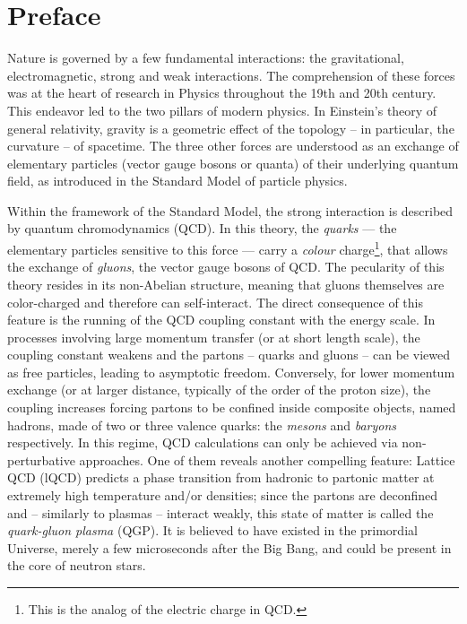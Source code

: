 \chapter{Preface}
\label{chap:Chapter1}

Nature is governed by a few fundamental interactions: the gravitational, electromagnetic, strong and weak interactions. The comprehension of these forces was at the heart of research in Physics throughout the 19th and 20th century. This endeavor led to the two pillars of modern physics. In Einstein's theory of general relativity, gravity is a geometric effect of the topology -- in particular, the curvature -- of spacetime. The three other forces are understood as an exchange of elementary particles (vector gauge bosons or quanta) of their underlying quantum field, as introduced in the Standard Model of particle physics.

Within the framework of the Standard Model, the strong interaction is described by quantum chromodynamics (QCD). In this theory, the \textit{quarks} --- the elementary particles sensitive to this force --- carry a \textit{colour} charge\footnote{This is the analog of the electric charge in QCD.}, that allows the exchange of \textit{gluons}, the vector gauge bosons of QCD. The pecularity of this theory resides in its non-Abelian structure, meaning that gluons themselves are color-charged and therefore can self-interact. The direct consequence of this feature is the running of the QCD coupling constant with the energy scale. In processes involving large momentum transfer (or at short length scale), the coupling constant weakens and the partons -- quarks and gluons -- can be viewed as free particles, leading to asymptotic freedom. Conversely, for lower momentum exchange (or at larger distance, typically of the order of the proton size), the coupling increases forcing partons to be confined inside composite objects, named hadrons, made of two or three valence quarks: the \textit{mesons} and \textit{baryons} respectively. In this regime, QCD calculations can only be achieved via non-perturbative approaches. One of them reveals another compelling feature: Lattice QCD (lQCD) predicts a phase transition from hadronic to partonic matter at extremely high temperature and/or densities; since the partons are deconfined and -- similarly to plasmas -- interact weakly, this state of matter is called the \textit{quark-gluon plasma} (QGP). It is believed to have existed in the primordial Universe, merely a few microseconds after the Big Bang, and could be present in the core of neutron stars. \\

